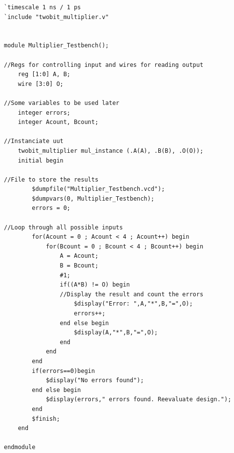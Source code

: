 \begin{lstlisting}[style=verilogStyle, caption=Multiplier Testbench in Verilog, label=verilog_multiplierTB]
`timescale 1 ns / 1 ps
`include "twobit_multiplier.v"


module Multiplier_Testbench();

//Regs for controlling input and wires for reading output
    reg [1:0] A, B;
    wire [3:0] O;

//Some variables to be used later
    integer errors;
    integer Acount, Bcount;

//Instanciate uut
    twobit_multiplier mul_instance (.A(A), .B(B), .O(O));
    initial begin

//File to store the results
        $dumpfile("Multiplier_Testbench.vcd");
        $dumpvars(0, Multiplier_Testbench);
        errors = 0;

//Loop through all possible inputs
        for(Acount = 0 ; Acount < 4 ; Acount++) begin
            for(Bcount = 0 ; Bcount < 4 ; Bcount++) begin
                A = Acount;
                B = Bcount;
                #1;
                if((A*B) != O) begin
                //Display the result and count the errors
                    $display("Error: ",A,"*",B,"=",O);
                    errors++;
                end else begin
                    $display(A,"*",B,"=",O);
                end
            end
        end
        if(errors==0)begin
            $display("No errors found");
        end else begin
            $display(errors," errors found. Reevaluate design.");
        end
        $finish;
    end

endmodule
\end{lstlisting}


